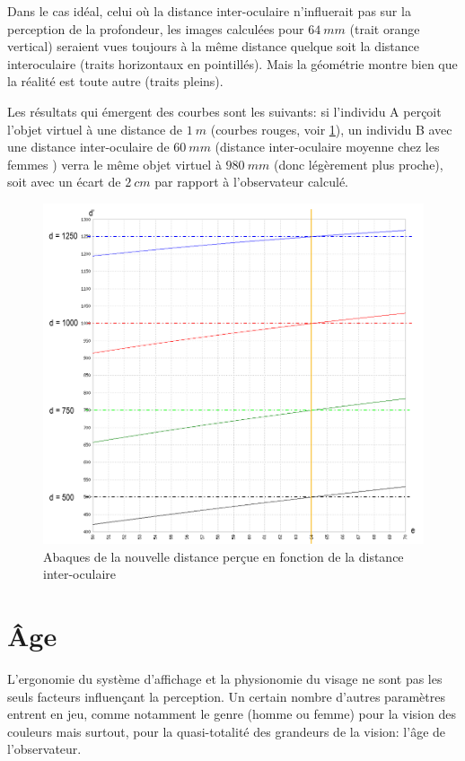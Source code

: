 	\par Dans le cas idéal, celui où la distance inter-oculaire n'influerait pas sur la perception de la profondeur, les images calculées pour $64~mm$ (trait orange vertical) seraient vues toujours à la même distance quelque soit la distance interoculaire (traits horizontaux en pointillés). Mais la géométrie montre bien que la réalité est toute autre (traits pleins).
	
	\par Les résultats qui émergent des courbes sont les suivants: si l'individu A perçoit l'objet virtuel à une distance de $1~m$ (courbes rouges, voir \ref{fig:abaque_dio}), un individu B avec une distance inter-oculaire de $60~mm$ (distance inter-oculaire moyenne chez les femmes \citep{dodgson_variation_2004}) verra le même objet virtuel à $980~mm$ (donc légèrement plus proche), soit avec un écart de $2~cm$ par rapport à l'observateur calculé.
	
	\begin{figure}[h]
		\centering
		\includegraphics[scale=.8]{Figures/AbaqueDIO}
		\caption{Abaques de la nouvelle distance perçue en fonction de la distance inter-oculaire}
		\label{fig:abaque_dio}
	\end{figure}
	
	\section{Âge}
	\par L'ergonomie du système d'affichage et la physionomie du visage ne sont pas les seuls facteurs influençant la perception. Un certain nombre d'autres paramètres entrent en jeu, comme notamment le genre (homme ou femme) pour la vision des couleurs \citep{fairchild_human_2005} mais surtout, pour la quasi-totalité des grandeurs de la vision: l'âge de l'observateur.
	
